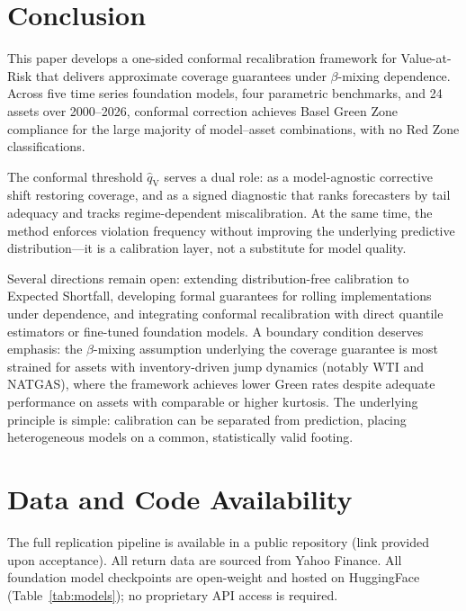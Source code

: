 \documentclass[preprint,11pt,authoryear]{elsarticle}
\newcommand{\1}{\boldsymbol{1}}
\newcommand{\qV}{\hat{q}_{\scriptscriptstyle\mathrm{V}}}
\begin{document}
	\section{Conclusion}
	\label{sec:conclude}
	
	This paper develops a one-sided conformal recalibration
	framework for Value-at-Risk that delivers approximate coverage
	guarantees under $\beta$-mixing dependence. Across five time
	series foundation models, four parametric benchmarks, and 24
	assets over 2000--2026, conformal correction achieves Basel
	Green Zone compliance for the large majority of model--asset
	combinations, with no Red Zone classifications.
	
	The conformal threshold $\qV$ serves a dual role: as a
	model-agnostic corrective shift restoring coverage, and as a
	signed diagnostic that ranks forecasters by tail adequacy and
	tracks regime-dependent miscalibration. At the same time, the
	method enforces violation frequency without improving the
	underlying predictive distribution---it is a calibration layer,
	not a substitute for model quality.
	
	Several directions remain open: extending distribution-free
	calibration to Expected Shortfall, developing formal guarantees
	for rolling implementations under dependence, and integrating
	conformal recalibration with direct quantile estimators or
	fine-tuned foundation models. A boundary condition deserves
	emphasis: the $\beta$-mixing assumption underlying the coverage
	guarantee is most strained for assets with inventory-driven
	jump dynamics (notably WTI and NATGAS), where the framework
	achieves lower Green rates despite adequate performance on
	assets with comparable or higher kurtosis.
	The underlying principle is simple: calibration can be
	separated from prediction, placing heterogeneous models on a
	common, statistically valid footing.
	
	\section*{Data and Code Availability}
	The full replication pipeline is available in a public repository (link provided upon acceptance). All return data are sourced from Yahoo Finance. All foundation model checkpoints are open-weight and hosted on HuggingFace (Table~\ref{tab:models}); no proprietary API access is required.
\end{document}
